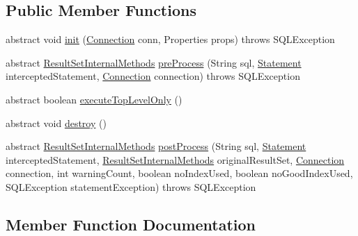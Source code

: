 \subsection*{Public Member Functions}
\begin{DoxyCompactItemize}
\item 
abstract void \mbox{\hyperlink{interfacecom_1_1mysql_1_1jdbc_1_1_statement_interceptor_v2_ae2d3d924826dcf4a4e025433af0b4d8f}{init}} (\mbox{\hyperlink{interfacecom_1_1mysql_1_1jdbc_1_1_connection}{Connection}} conn, Properties props)  throws S\+Q\+L\+Exception
\item 
abstract \mbox{\hyperlink{interfacecom_1_1mysql_1_1jdbc_1_1_result_set_internal_methods}{Result\+Set\+Internal\+Methods}} \mbox{\hyperlink{interfacecom_1_1mysql_1_1jdbc_1_1_statement_interceptor_v2_abe4a0e52fc3e4cc9b458dd8eaeef82ff}{pre\+Process}} (String sql, \mbox{\hyperlink{interfacecom_1_1mysql_1_1jdbc_1_1_statement}{Statement}} intercepted\+Statement, \mbox{\hyperlink{interfacecom_1_1mysql_1_1jdbc_1_1_connection}{Connection}} connection)  throws S\+Q\+L\+Exception
\item 
abstract boolean \mbox{\hyperlink{interfacecom_1_1mysql_1_1jdbc_1_1_statement_interceptor_v2_a36f03c5f5b1755d48549862d5b6c627f}{execute\+Top\+Level\+Only}} ()
\item 
abstract void \mbox{\hyperlink{interfacecom_1_1mysql_1_1jdbc_1_1_statement_interceptor_v2_a00bfb3d3f7b81e16a9cdf4784150c3f7}{destroy}} ()
\item 
abstract \mbox{\hyperlink{interfacecom_1_1mysql_1_1jdbc_1_1_result_set_internal_methods}{Result\+Set\+Internal\+Methods}} \mbox{\hyperlink{interfacecom_1_1mysql_1_1jdbc_1_1_statement_interceptor_v2_a6dadce27d32c6beaa303d46515307320}{post\+Process}} (String sql, \mbox{\hyperlink{interfacecom_1_1mysql_1_1jdbc_1_1_statement}{Statement}} intercepted\+Statement, \mbox{\hyperlink{interfacecom_1_1mysql_1_1jdbc_1_1_result_set_internal_methods}{Result\+Set\+Internal\+Methods}} original\+Result\+Set, \mbox{\hyperlink{interfacecom_1_1mysql_1_1jdbc_1_1_connection}{Connection}} connection, int warning\+Count, boolean no\+Index\+Used, boolean no\+Good\+Index\+Used, S\+Q\+L\+Exception statement\+Exception)  throws S\+Q\+L\+Exception
\end{DoxyCompactItemize}


\subsection{Member Function Documentation}
\mbox{\label{interfacecom_1_1mysql_1_1jdbc_1_1_statement_interceptor_v2_a00bfb3d3f7b81e16a9cdf4784150c3f7}} 
